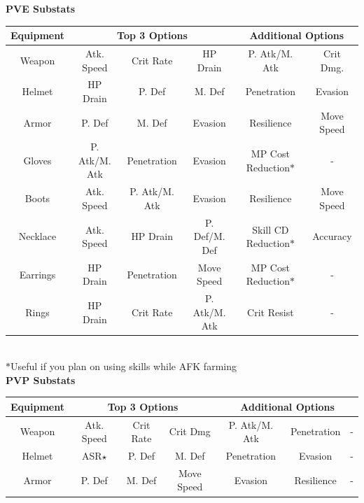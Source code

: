 \documentclass[]{article}
\begin{document}
\begin{center}
	\textbf{PVE Substats}\\
\begin{tabular}{|c|c|c|c|c|c|}
	\hline 
	\rule[-1ex]{0pt}{2.5ex} Equipment & \multicolumn{3}{c|}{Top 3 Options} &\multicolumn{2}{c|}{Additional Options} \\ 
	\hline 
	\rule[-1ex]{0pt}{2.5ex} Weapon & Atk. Speed & Crit Rate & HP Drain & P. Atk/M. Atk & Crit Dmg. \\ 
	\rule[-1ex]{0pt}{2.5ex} Helmet & HP Drain & P. Def & M. Def & Penetration & Evasion \\ 
	\rule[-1ex]{0pt}{2.5ex} Armor & P. Def & M. Def & Evasion & Resilience & Move Speed \\ 
	\rule[-1ex]{0pt}{2.5ex} Gloves & P. Atk/M. Atk & Penetration & Evasion & MP Cost Reduction$*$ & - \\ 
	\rule[-1ex]{0pt}{2.5ex} Boots & Atk. Speed & P. Atk/M. Atk & Evasion & Resilience & Move Speed \\ 
	\rule[-1ex]{0pt}{2.5ex} Necklace & Atk. Speed & HP Drain & P. Def/M. Def & Skill CD Reduction$*$ & Accuracy \\ 
	\rule[-1ex]{0pt}{2.5ex} Earrings & HP Drain & Penetration & Move Speed & MP Cost Reduction$*$ & - \\ 
	\rule[-1ex]{0pt}{2.5ex} Rings & HP Drain & Crit Rate & P. Atk/M. Atk & Crit Resist & - \\ 
	\hline 
\end{tabular}
\\ 
$*$Useful if you plan on using skills while AFK farming
\\
\textbf{PVP Substats}
\begin{tabular}{|c|c|c|c|c|c|c|}
	\hline 
	Equipment & \multicolumn{3}{c|}{Top 3 Options} & \multicolumn{3}{c|}{Additional Options}\\ 
	\hline 
	Weapon & Atk. Speed & Crit Rate & Crit Dmg & P. Atk/M. Atk & Penetration & - \\ 
	Helmet & ASR$\star$ & P. Def & M. Def & Penetration & Evasion & - \\ 
	Armor & P. Def & M. Def & Move Speed & Evasion & Resilience & - \\ 

\end{tabular}
\end{center}
\end{document}
